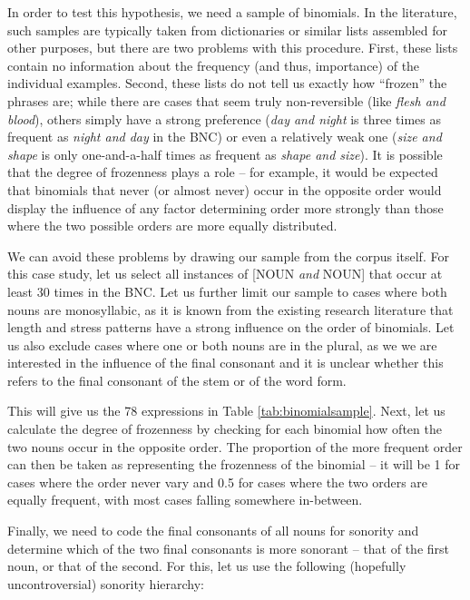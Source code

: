 In order to test this hypothesis, we need a sample of binomials. In the literature, such samples are typically taken from dictionaries or similar lists assembled for other purposes, but there are two problems with this procedure. First, these lists contain no information about the frequency (and thus, importance) of the individual examples. Second, these lists do not tell us exactly how ``frozen'' the phrases are; while there are cases that seem truly non-reversible (like \textit{flesh and blood}), others simply have a strong preference (\textit{day and night} is three times as frequent as \textit{night and day} in the BNC) or even a relatively weak one (\textit{size and shape} is only one-and-a-half times as frequent as \textit{shape and size}). It is possible that the degree of frozenness plays a role -- for example, it would be expected that binomials that never (or almost never) occur in the opposite order would display the influence of any factor determining order more strongly than those where the two possible orders are more equally distributed.

We can avoid these problems by drawing our sample from the corpus itself. For this case study, let us select all instances of [NOUN \textit{and} NOUN] that occur at least 30 times in the BNC. Let us further limit our sample to cases where both nouns are monosyllabic, as it is known from the existing research literature that length and stress patterns have a strong influence on the order of binomials. Let us also exclude cases where one or both nouns are in the plural, as we we are interested in the influence of the final consonant and it is unclear whether this refers to the final consonant of the stem or of the word form.

This will give us the 78 expressions in Table \ref{tab:binomialsample}. Next, let us calculate the degree of frozenness by checking for each binomial how often the two nouns occur in the opposite order. The proportion of the more frequent order can then be taken as representing the frozenness of the binomial -- it will be 1 for cases where the order never vary and 0.5 for cases where the two orders are equally frequent, with most cases falling somewhere in-between.

Finally, we need to code the final consonants of all nouns for sonority and determine which of the two final consonants is more sonorant -- that of the first noun, or that of the second. For this, let us use the following (hopefully uncontroversial) sonority hierarchy:

